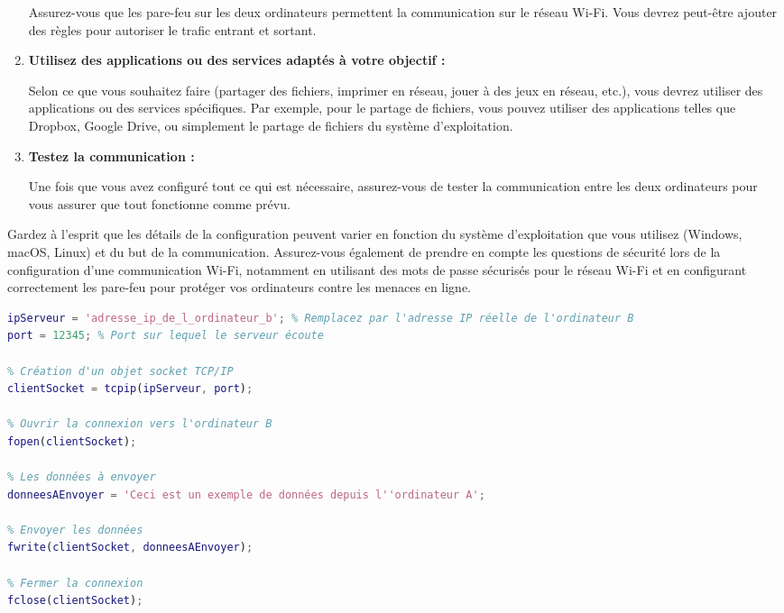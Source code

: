 \begin{enumerate}
    Assurez-vous que les pare-feu sur les deux ordinateurs permettent la communication sur le réseau Wi-Fi. Vous devrez peut-être ajouter des règles pour autoriser le trafic entrant et sortant.
    
    \item \textbf{Utilisez des applications ou des services adaptés à votre objectif :}
    
    Selon ce que vous souhaitez faire (partager des fichiers, imprimer en réseau, jouer à des jeux en réseau, etc.), vous devrez utiliser des applications ou des services spécifiques. Par exemple, pour le partage de fichiers, vous pouvez utiliser des applications telles que Dropbox, Google Drive, ou simplement le partage de fichiers du système d'exploitation.
    
    \item \textbf{Testez la communication :}
    
    Une fois que vous avez configuré tout ce qui est nécessaire, assurez-vous de tester la communication entre les deux ordinateurs pour vous assurer que tout fonctionne comme prévu.
\end{enumerate}

Gardez à l'esprit que les détails de la configuration peuvent varier en fonction du système d'exploitation que vous utilisez (Windows, macOS, Linux) et du but de la communication. Assurez-vous également de prendre en compte les questions de sécurité lors de la configuration d'une communication Wi-Fi, notamment en utilisant des mots de passe sécurisés pour le réseau Wi-Fi et en configurant correctement les pare-feu pour protéger vos ordinateurs contre les menaces en ligne.

\begin{lstlisting}[language=Matlab, caption={Programme MATLAB sur l'ordinateur A (l'émetteur)}]
% Adresse IP de l'ordinateur B (serveur)
ipServeur = 'adresse_ip_de_l_ordinateur_b'; % Remplacez par l'adresse IP réelle de l'ordinateur B
port = 12345; % Port sur lequel le serveur écoute

% Création d'un objet socket TCP/IP
clientSocket = tcpip(ipServeur, port);

% Ouvrir la connexion vers l'ordinateur B
fopen(clientSocket);

% Les données à envoyer
donneesAEnvoyer = 'Ceci est un exemple de données depuis l''ordinateur A';

% Envoyer les données
fwrite(clientSocket, donneesAEnvoyer);

% Fermer la connexion
fclose(clientSocket);

\end{lstlisting}


